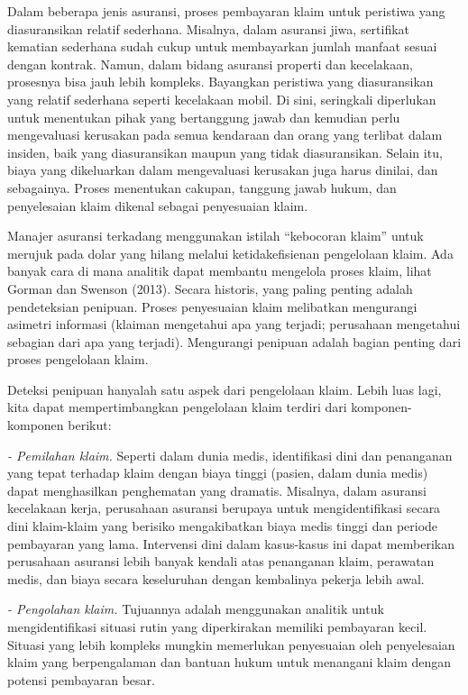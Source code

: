 \documentclass[
]{book}
\begin{document}
Dalam beberapa jenis asuransi, proses pembayaran klaim untuk peristiwa yang diasuransikan relatif sederhana. Misalnya, dalam asuransi jiwa, sertifikat kematian sederhana sudah cukup untuk membayarkan jumlah manfaat sesuai dengan kontrak. Namun, dalam bidang asuransi properti dan kecelakaan, prosesnya bisa jauh lebih kompleks. Bayangkan peristiwa yang diasuransikan yang relatif sederhana seperti kecelakaan mobil. Di sini, seringkali diperlukan untuk menentukan pihak yang bertanggung jawab dan kemudian perlu mengevaluasi kerusakan pada semua kendaraan dan orang yang terlibat dalam insiden, baik yang diasuransikan maupun yang tidak diasuransikan. Selain itu, biaya yang dikeluarkan dalam mengevaluasi kerusakan juga harus dinilai, dan sebagainya. Proses menentukan cakupan, tanggung jawab hukum, dan penyelesaian klaim dikenal sebagai penyesuaian klaim.

Manajer asuransi terkadang menggunakan istilah ``kebocoran klaim'' untuk merujuk pada dolar yang hilang melalui ketidakefisienan pengelolaan klaim. Ada banyak cara di mana analitik dapat membantu mengelola proses klaim, lihat Gorman dan Swenson (2013). Secara historis, yang paling penting adalah pendeteksian penipuan. Proses penyesuaian klaim melibatkan mengurangi asimetri informasi (klaiman mengetahui apa yang terjadi; perusahaan mengetahui sebagian dari apa yang terjadi). Mengurangi penipuan adalah bagian penting dari proses pengelolaan klaim.

Deteksi penipuan hanyalah satu aspek dari pengelolaan klaim. Lebih luas lagi, kita dapat mempertimbangkan pengelolaan klaim terdiri dari komponen-komponen berikut:

\emph{- Pemilahan klaim.} Seperti dalam dunia medis, identifikasi dini dan penanganan yang tepat terhadap klaim dengan biaya tinggi (pasien, dalam dunia medis) dapat menghasilkan penghematan yang dramatis. Misalnya, dalam asuransi kecelakaan kerja, perusahaan asuransi berupaya untuk mengidentifikasi secara dini klaim-klaim yang berisiko mengakibatkan biaya medis tinggi dan periode pembayaran yang lama. Intervensi dini dalam kasus-kasus ini dapat memberikan perusahaan asuransi lebih banyak kendali atas penanganan klaim, perawatan medis, dan biaya secara keseluruhan dengan kembalinya pekerja lebih awal.

\emph{- Pengolahan klaim.} Tujuannya adalah menggunakan analitik untuk mengidentifikasi situasi rutin yang diperkirakan memiliki pembayaran kecil. Situasi yang lebih kompleks mungkin memerlukan penyesuaian oleh penyelesaian klaim yang berpengalaman dan bantuan hukum untuk menangani klaim dengan potensi pembayaran besar.
\end{document}
